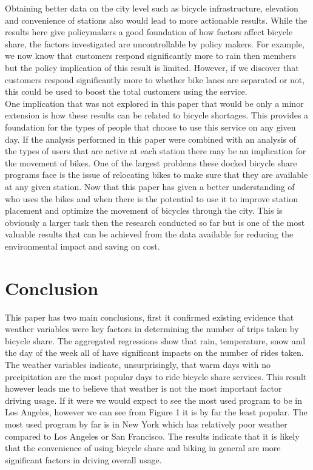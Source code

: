 \documentclass[12pt,letter paper]{article}
\begin{document}
Obtaining better data on the city level such as bicycle infrastructure, elevation and convenience of stations also would lead to more actionable results.  While the results here give policymakers a good foundation of how factors affect bicycle share, the factors investigated are uncontrollable by policy makers.  For example, we now know that customers respond significantly more to rain then members but the policy implication of this result is limited.  However, if we discover that customers respond significantly more to whether bike lanes are separated or not, this could be used to boost the total customers using the service.  \\

One implication that was not explored in this paper that would be only a minor extension is how these results can be related to bicycle shortages.  This provides a foundation for the types of people that choose to use this service on any given day.  If the analysis performed in this paper were combined with an analysis of the types of users that are active at each station there may be an implication for the movement of bikes.  One of the largest problems these docked bicycle share programs face is the issue of relocating bikes to make sure that they are available at any given station.  Now that this paper has given a better understanding of who uses the bikes and when there is the potential to use it to improve station placement and optimize the movement of bicycles through the city.  This is obviously a larger task then the research conducted so far but is one of the most valuable results that can be achieved from the data available for reducing the environmental impact and saving on cost. 

\section{Conclusion}
This paper has two main conclusions, first it confirmed existing evidence that weather variables were key factors in determining the number of trips taken by bicycle share.  The aggregated regressions show that rain, temperature, snow and the day of the week all of have significant impacts on the number of rides taken.  The weather variables indicate, unsurprisingly, that warm days with no precipitation are the most popular days to ride bicycle share services.  This result however leads me to believe that weather is not the most important factor driving usage.  If it were we would expect to see the most used program to be in Los Angeles, however we can see from Figure 1 it is by far the least popular.  The most used program  by far is in New York which has relatively poor weather compared to Los Angeles or San Francisco.  The results indicate that it is likely that the convenience of using bicycle share and biking in general are more significant factors in driving overall usage. \\
\end{document}
